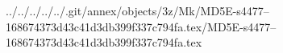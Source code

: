 ../../../../../.git/annex/objects/3z/Mk/MD5E-s4477--168674373d43c41d3db399f337c794fa.tex/MD5E-s4477--168674373d43c41d3db399f337c794fa.tex